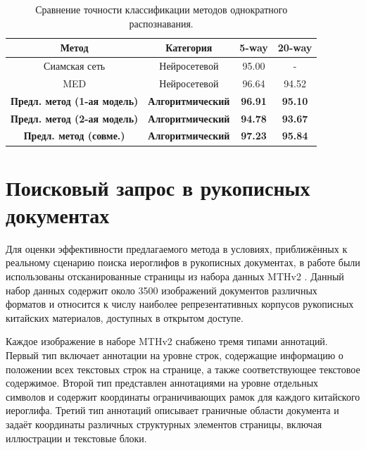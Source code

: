 \begin{table}
    \centering
    \captionsetup{justification=centering} %
    \caption{Сравнение точности классификации методов однократного распознавания. }\label{tab:result_1}
    \begin{tabular}{cccc}
        \toprule
        \textbf{Метод}                      & \textbf{Категория}       & \textbf{5-way} & \textbf{20-way} \\
        \midrule
        Сиамская сеть \cite{li2022large}    & Нейросетевой             & 95.00          & -               \\
        MED \cite{ma2020joint}              & Нейросетевой             & 96.64          & 94.52           \\
        \textbf{Предл. метод (1-ая модель)} & \textbf{Алгоритмический} & \textbf{96.91} & \textbf{95.10}  \\
        \textbf{Предл. метод (2-ая модель)} & \textbf{Алгоритмический} & \textbf{94.78} & \textbf{93.67}  \\
        \textbf{Предл. метод (совме.)}      & \textbf{Алгоритмический} & \textbf{97.23} & \textbf{95.84}  \\
        \bottomrule
    \end{tabular}
\end{table}

\section{Поисковый запрос в рукописных документах}\label{sec:ch5/sect2}

Для оценки эффективности предлагаемого метода в условиях, приближённых к реальному сценарию поиска иероглифов в рукописных документах, в работе были использованы отсканированные страницы из набора данных MTHv2 \cite{ma2020joint}. Данный набор данных содержит около 3500 изображений документов различных форматов и относится к числу наиболее репрезентативных корпусов рукописных китайских материалов, доступных в открытом доступе.

Каждое изображение в наборе MTHv2 снабжено тремя типами аннотаций. Первый тип включает аннотации на уровне строк, содержащие информацию о положении всех текстовых строк на странице, а также соответствующее текстовое содержимое. Второй тип представлен аннотациями на уровне отдельных символов и содержит координаты ограничивающих рамок для каждого китайского иероглифа. Третий тип аннотаций описывает граничные области документа и задаёт координаты различных структурных элементов страницы, включая иллюстрации и текстовые блоки.

